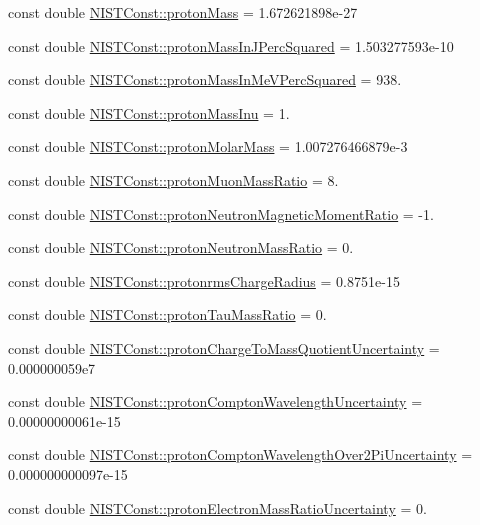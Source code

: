 \begin{DoxyCompactItemize}
\item 
const double \hyperlink{group___proton_gaa6738785a6bf04323231318dd6b2ed90}{N\+I\+S\+T\+Const\+::proton\+Mass} = 1.\+672621898e-\/27
\item 
const double \hyperlink{group___proton_gae46a62aa4ccd40b74db6a45a3933cf0f}{N\+I\+S\+T\+Const\+::proton\+Mass\+In\+J\+Perc\+Squared} = 1.\+503277593e-\/10
\item 
const double \hyperlink{group___proton_gad2f4fab753bd216193f8c31ced93d46d}{N\+I\+S\+T\+Const\+::proton\+Mass\+In\+Me\+V\+Perc\+Squared} = 938.
\item 
const double \hyperlink{group___proton_gaf2a9916164fce50112bd8bbe8b712e5a}{N\+I\+S\+T\+Const\+::proton\+Mass\+Inu} = 1.
\item 
const double \hyperlink{group___proton_ga8a29760b90301104dbd9512674eccc4c}{N\+I\+S\+T\+Const\+::proton\+Molar\+Mass} = 1.\+007276466879e-\/3
\item 
const double \hyperlink{group___proton_gab9c5458c70434c20a8527661c4ff0b73}{N\+I\+S\+T\+Const\+::proton\+Muon\+Mass\+Ratio} = 8.
\item 
const double \hyperlink{group___proton_ga349fed5e91e8d7f8d71ba45405da64e7}{N\+I\+S\+T\+Const\+::proton\+Neutron\+Magnetic\+Moment\+Ratio} = -\/1.
\item 
const double \hyperlink{group___proton_ga8b54a81cc7dec7f196f874dcc81dbab2}{N\+I\+S\+T\+Const\+::proton\+Neutron\+Mass\+Ratio} = 0.
\item 
const double \hyperlink{group___proton_gadc726e50679ce96f2d6c0e84c378998e}{N\+I\+S\+T\+Const\+::protonrms\+Charge\+Radius} = 0.\+8751e-\/15
\item 
const double \hyperlink{group___proton_ga6b8624fb113601433f311bb5d3423115}{N\+I\+S\+T\+Const\+::proton\+Tau\+Mass\+Ratio} = 0.
\item 
const double \hyperlink{group___proton_ga5040619a0a4a6ebd0d96e4bf6740a083}{N\+I\+S\+T\+Const\+::proton\+Charge\+To\+Mass\+Quotient\+Uncertainty} = 0.\+000000059e7
\item 
const double \hyperlink{group___proton_gacd9d26e2857b120b9b875843afd3d04e}{N\+I\+S\+T\+Const\+::proton\+Compton\+Wavelength\+Uncertainty} = 0.\+00000000061e-\/15
\item 
const double \hyperlink{group___proton_ga186c0793c8cc85f31697d61b2cce6131}{N\+I\+S\+T\+Const\+::proton\+Compton\+Wavelength\+Over2\+Pi\+Uncertainty} = 0.\+000000000097e-\/15
\item 
const double \hyperlink{group___proton_ga32c824b498d8050a6b950467ed18344e}{N\+I\+S\+T\+Const\+::proton\+Electron\+Mass\+Ratio\+Uncertainty} = 0.

\end{DoxyCompactItemize}
